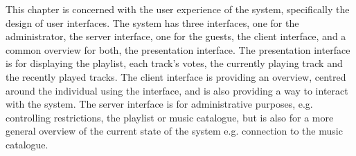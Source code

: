 This chapter is concerned with the user experience of the system, specifically the design of user interfaces.
The system has three interfaces, one for the administrator, the server interface, one for the guests, the client interface, and a common overview for both, the presentation interface. 
The presentation interface is for displaying the playlist, each track's votes, the currently playing track and the recently played tracks. 
The client interface is providing an overview, centred around the individual using the interface, and is also providing a way to interact with the system. 
The server interface is for administrative purposes, e.g. controlling restrictions, the playlist or music catalogue, but is also for a more general overview of the current state of the system e.g. connection to the music catalogue.
